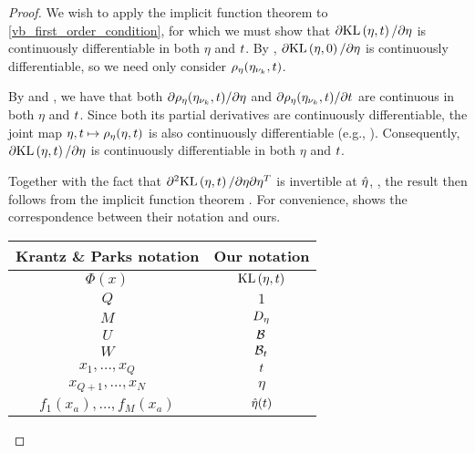\begin{thm}
\begin{proof}
We wish to apply the implicit function theorem to
\eqref{vb_first_order_condition}, for which we must show that $\partial
\mathrm{KL}\left(\eta, t\right) / \partial \eta$ is continuously differentiable in both $\eta$ and
$t$.  By , $\partial \mathrm{KL}\left(\eta, 0\right) /
\partial \eta$ is continuously differentiable, so we need only consider
$\rho_\eta(\eta_{\nu_{k}}, t)$.

By  and , we
have that both $\partial \rho_\eta(\eta_{\nu_{k}}, t) / \partial \eta$ and $\partial
\rho_\eta(\eta_{\nu_{k}}, t) / \partial t$ are continuous in both $\eta$ and $t$.
Since both its partial derivatives are continuously differentiable, the joint
map $\eta, t \mapsto \rho_\eta(\eta, t)$ is also continuously differentiable
(e.g., \citet[Theorem 3.2]{fleming:2012:functions}).  Consequently, $\partial
\mathrm{KL}\left(\eta, t\right) / \partial \eta$ is continuously differentiable in both $\eta$ and
$t$.


Together with the fact that $\partial^2 \mathrm{KL}\left(\eta, t\right) / \partial \eta
\partial\eta^T$ is invertible at $\hat\eta$, ,
the result then follows from the implicit function theorem \citet[Theorem
3.3.1]{krantz:2012:implicit}. For convenience,  shows the
correspondence between their notation and ours.

\begin{center}
\begin{tabular}{|c|c|}
%
\hline Krantz \& Parks notation & Our notation \\\hline
$\Phi(x)$                       & $\mathrm{KL}\left(\eta, t\right)$ \\\hline
$Q$                             & $1$ \\\hline
$M$                             & ${D_{\eta}}$ \\\hline
$U$                             & $\mathcal{B}$ \\\hline
$W$                             & $\mathcal{B}_t$ \\\hline
$x_1,\ldots,x_Q$                & $t$ \\\hline
$x_{Q+1},\ldots,x_N$            & $\eta$ \\\hline
$f_1(x_a), \ldots,f_M(x_a)$     & $\hat\eta(t)$ \\\hline
%
\end{tabular}
\end{center}
%
\end{proof}
%
\end{thm}

